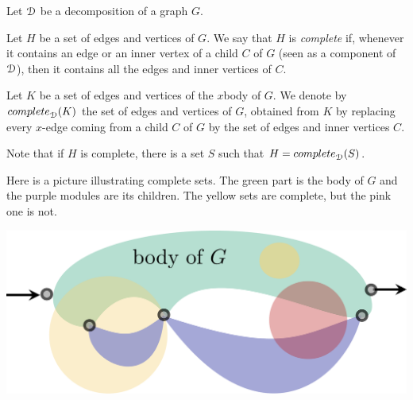 \begin{definition} Let $\mathcal D$ be a decomposition of a graph $G$. 
\smallskip

Let $H$ be a set of edges and vertices of $G$. We say that $H$ is \emph{complete} if, whenever it contains an edge or an inner vertex of a child $C$ of $G$ (seen as a component of $\mathcal D$), then it contains all the edges and  inner vertices of $C$. 
\smallskip

Let $K$ be a set of edges and vertices of the $x$\text{-}body of $G$.  We denote by $\mathsf{complete}_\cD(K)$ the set of edges and vertices of $G$,  obtained from $K$ by replacing every $x$-edge coming from a child $C$ of $G$  by the set of edges and inner vertices $C$.  
\end{definition}
\begin{remark}
Note that if $H$ is complete, there is a set $S$ such that $H=\mathsf{complete}_\cD(S)$.
\end{remark}

Here is a picture illustrating complete sets. The green part is the body of $G$ and the purple modules are its children. The yellow sets are complete, but the pink one is not. 
\begin{center}
\includegraphics[scale=.12]{Pictures/complete-set}
\end{center}

